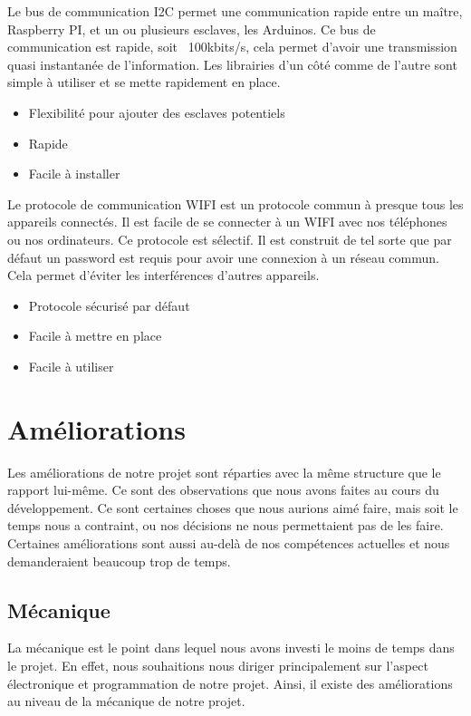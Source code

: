\documentclass[
	a4paper,									%
	11pt,										%
	twoside,									%
	openright,									%
	notitlepage,									%
	parskip=half,								%
]{scrreprt}										%
\begin{document}
Le bus de communication I2C permet une communication rapide entre un maître, Raspberry PI, et un ou plusieurs esclaves, les Arduinos. 
Ce bus de communication est rapide, soit ~100kbits/s, cela permet d'avoir une transmission quasi instantanée de l'information.
Les librairies d'un côté comme de l'autre sont simple à utiliser et se mette rapidement en place. 

\begin{itemize}
	\item Flexibilité pour ajouter des esclaves potentiels
	\item Rapide
	\item Facile à installer
\end{itemize}

Le protocole de communication WIFI est un protocole commun à presque tous les appareils connectés. Il est facile de se connecter 
à un WIFI avec nos téléphones ou nos ordinateurs. Ce protocole est sélectif. Il est construit de tel sorte que par défaut un 
password est requis pour avoir une connexion à un réseau commun. Cela permet d'éviter les interférences d'autres appareils. 

\begin{itemize}
	\item Protocole sécurisé par défaut 
	\item Facile à mettre en place
	\item Facile à utiliser
\end{itemize}

\chapter{Améliorations}

Les améliorations de notre projet sont réparties avec la même structure que le rapport lui-même. 
Ce sont des observations que nous avons faites au cours du développement. Ce sont certaines 
choses que nous aurions aimé faire, mais soit le temps nous a contraint, ou nos décisions 
ne nous permettaient pas de les faire. Certaines améliorations sont aussi au-delà de nos 
compétences actuelles et nous demanderaient beaucoup trop de temps. \par

\section{Mécanique}

La mécanique est le point dans lequel nous avons investi le moins de temps dans le projet. 
En effet, nous souhaitions nous diriger principalement sur l'aspect électronique et programmation
de notre projet. Ainsi, il existe des améliorations au niveau de la mécanique de notre projet. \par
\end{document}
